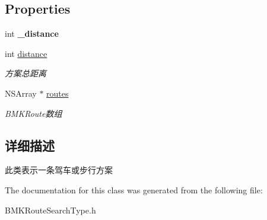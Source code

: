 \subsection*{Properties}
\begin{DoxyCompactItemize}
\item 
\hypertarget{interface_b_m_k_route_plan_afb7f5f3ff9b33d65172aaf4657d0d0d6}{int {\bfseries \-\_\-distance}}\label{interface_b_m_k_route_plan_afb7f5f3ff9b33d65172aaf4657d0d0d6}

\item 
\hypertarget{interface_b_m_k_route_plan_aa9020d0fe83a58c2192157f47d7930eb}{int \hyperlink{interface_b_m_k_route_plan_aa9020d0fe83a58c2192157f47d7930eb}{distance}}\label{interface_b_m_k_route_plan_aa9020d0fe83a58c2192157f47d7930eb}

\begin{DoxyCompactList}\small\item\em 方案总距离 \end{DoxyCompactList}\item 
\hypertarget{interface_b_m_k_route_plan_a93cd92070e92c4c1a25a8e127bd8b6d5}{N\-S\-Array $\ast$ \hyperlink{interface_b_m_k_route_plan_a93cd92070e92c4c1a25a8e127bd8b6d5}{routes}}\label{interface_b_m_k_route_plan_a93cd92070e92c4c1a25a8e127bd8b6d5}

\begin{DoxyCompactList}\small\item\em B\-M\-K\-Route数组 \end{DoxyCompactList}\end{DoxyCompactItemize}


\subsection{详细描述}
此类表示一条驾车或步行方案 

The documentation for this class was generated from the following file\-:\begin{DoxyCompactItemize}
\item 
B\-M\-K\-Route\-Search\-Type.\-h\end{DoxyCompactItemize}

